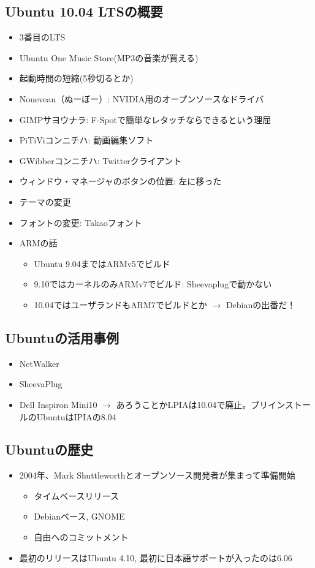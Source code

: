 \documentclass[mingoth,a4paper]{jsarticle}
\begin{document}
\begin{multicols}{2}
\subsection{Ubuntu 10.04 LTSの概要}
\begin{itemize}
      \item 3番目のLTS
      \item Ubuntu One Music Store(MP3の音楽が買える)
      \item 起動時間の短縮(5秒切るとか)
      \item Noueveau（ぬーぼー）: NVIDIA用のオープンソースなドライバ
      \item GIMPサヨウナラ: F-Spotで簡単なレタッチならできるという理屈
      \item PiTiViコンニチハ: 動画編集ソフト
      \item GWibberコンニチハ:  Twitterクライアント
      \item ウィンドウ・マネージャのボタンの位置: 左に移った
      \item テーマの変更
      \item フォントの変更: Takaoフォント
      \item ARMの話
    \begin{itemize}
          \item Ubuntu 9.04まではARMv5でビルド
          \item 9.10ではカーネルのみARMv7でビルド: Sheevaplugで動かない
          \item 10.04ではユーザランドもARM7でビルドとか $\rightarrow$ Debianの出番だ！
    \end{itemize}
\end{itemize}

\subsection{Ubuntuの活用事例}
\begin{itemize}
      \item NetWalker
      \item SheevaPlug
      \item Dell Inspiron Mini10 $\rightarrow$  あろうことかLPIAは10.04で廃止。プリインストールのUbuntuはIPIAの8.04
\end{itemize}

\subsection{Ubuntuの歴史}

\begin{itemize}
      \item 2004年、Mark Shuttleworthとオープンソース開発者が集まって準備開始
    \begin{itemize}
          \item タイムベースリリース
          \item Debianベース, GNOME
          \item 自由へのコミットメント
    \end{itemize}
      \item 最初のリリースはUbuntu 4.10, 最初に日本語サポートが入ったのは6.06
\end{itemize}


\end{multicols}
\end{document}
